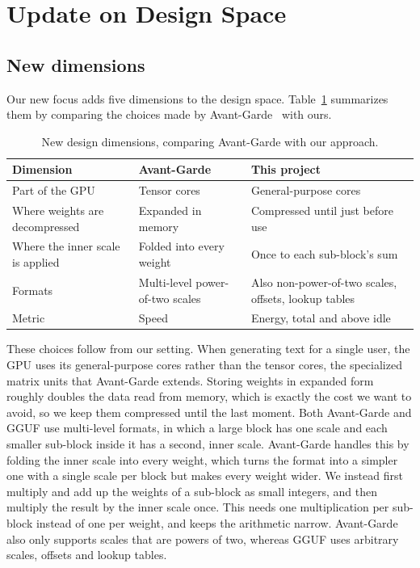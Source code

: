 \documentclass[10pt,twocolumn,letterpaper]{article}
\begin{document}
\section{Update on Design Space}

\subsection{New dimensions}
Our new focus adds five dimensions to the design space. Table~\ref{tab:design} summarizes them by comparing the
choices made by Avant-Garde~\cite{ag} with ours.

\begin{table}[h]
\centering\small
\caption{New design dimensions, comparing Avant-Garde with our approach.}
\label{tab:design}
\begin{tabular}{@{}>{\raggedright\arraybackslash}p{}>{\raggedright\arraybackslash}p{}>{\raggedright\arraybackslash}p{}@{}}
\toprule
Dimension & Avant-Garde & This project\\
\midrule
Part of the GPU & Tensor cores & General-purpose cores\\\addlinespace[3pt]
Where weights are decompressed & Expanded in memory & Compressed until just before use\\\addlinespace[3pt]
Where the inner scale is applied & Folded into every weight & Once to each sub-block's sum\\\addlinespace[3pt]
Formats & Multi-level power-of-two scales & Also non-power-of-two scales, offsets, lookup tables\\\addlinespace[3pt]
Metric & Speed & Energy, total and above idle\\
\bottomrule
\end{tabular}
\end{table}

These choices follow from our setting. When generating text for a single user, the GPU uses its general-purpose
cores rather than the tensor cores, the specialized matrix units that Avant-Garde extends. Storing weights in expanded form roughly doubles the
data read from memory, which is exactly the cost we want to avoid, so we keep them compressed until the last
moment. Both Avant-Garde and GGUF use multi-level formats, in which a large block has one scale and each smaller
sub-block inside it has a second, inner scale. Avant-Garde handles this by folding the inner scale into every
weight, which turns the format into a simpler one with a single scale per block but makes every weight wider. We
instead first multiply and add up the weights of a sub-block as small integers, and then multiply the result by the
inner scale once. This needs one multiplication per sub-block instead of one per weight, and keeps the arithmetic
narrow. Avant-Garde also only supports scales that are powers of two, whereas GGUF uses arbitrary scales, offsets
and lookup tables.
\end{document}
